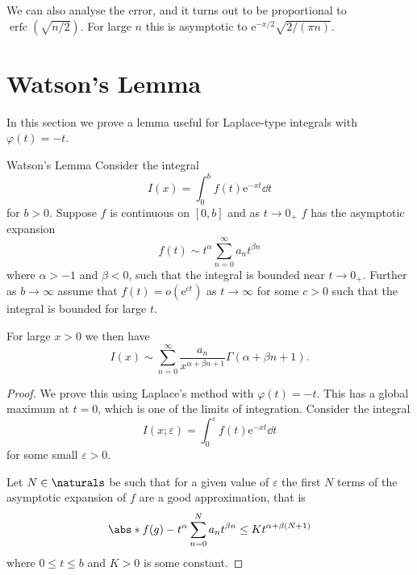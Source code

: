 \documentclass[fleqn]{NotesClass}
\newcommand*{\e}{\mathrm{e}}
\DeclareMathOperator{\erfc}{erfc}
\begin{document}
    We can also analyse the error, and it turns out to be proportional to \(\erfc(\sqrt{n/2})\).
    For large \(n\) this is asymptotic to \(\e^{-x/2}\sqrt{2/(\pi n)}\).
    
    \section{Watson's Lemma}
    In this section we prove a lemma useful for Laplace-type integrals with \(\varphi(t) = -t\).
    
    \begin{lma}{Watson's Lemma}{}
        Consider the integral
        \begin{equation}
            I(x) = \int_0^b f(t)\e^{-xt} \dd{t}
        \end{equation}
        for \(b > 0\).
        Suppose \(f\) is continuous on \([0, b]\) and as \(t \to 0_+\) \(f\) has the asymptotic expansion
        \begin{equation}
            f(t) \sim t^{\alpha} \sum_{n=0}^{\infty} a_nt^{\beta n}
        \end{equation}
        where \(\alpha > -1\) and \(\beta < 0\), such that the integral is bounded near \(t \to 0_+\).
        Further as \(b \to \infty\) assume that \(f(t) = o(\e^{ct})\) as \(t \to \infty\) for some \(c > 0\) such that the integral is bounded for large \(t\).
        
        For large \(x > 0\) we then have
        \begin{equation}
            I(x) \sim \sum_{n=0}^{\infty} \frac{a_n}{x^{\alpha+\beta n + 1}}\Gamma(\alpha + \beta n + 1).
        \end{equation}
        
        \begin{proof}
            We prove this using Laplace's method with \(\varphi(t) = -t\).
            This has a global maximum at \(t = 0\), which is one of the limits of integration.
            Consider the integral
            \begin{equation}
                I(x; \varepsilon) = \int_0^\varepsilon f(t) \e^{-xt}\dd{t}
            \end{equation}
            for some small \(\varepsilon > 0\).
            
            Let \(N \in \naturals\) be such that for a given value of \(\varepsilon\) the first \(N\) terms of the asymptotic expansion of \(f\) are a good approximation, that is
            \begin{equation}
                \abs*{f(g) - t^\alpha \sum_{n=0}^{N} a_n t^{\beta n}} \le K t^{\alpha + \beta(N + 1)}
            \end{equation}
            where \(0 \le t \le b\) and \(K > 0\) is some constant.
            

\end{proof}
\end{lma}
\end{document}
